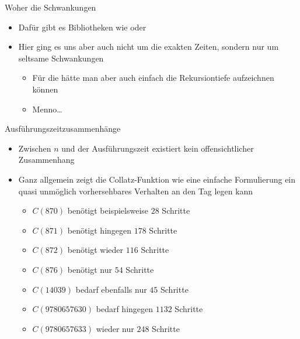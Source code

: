 {\begin{frame}{Woher die Schwankungen}
\begin{itemize}[<+(1)->]
\begin{itemize}
        \item Das Zeitmessen selbst braucht Zeit
        \item Die Java Virtual Machine hat zu Beginn einiges zusätzlich zu tun
        \item Dienste wie die Garbage-Collection können unkontrolliert dazwischenfunken
    \end{itemize}
    \item Dafür gibt es Bibliotheken wie  oder 
    \item Hier ging es uns aber auch nicht um die exakten Zeiten, sondern nur um seltsame Schwankungen \begin{itemize}
        \item Für die hätte man aber auch einfach die Rekursiontiefe aufzeichnen können
        \item Menno\ldots
    \end{itemize}
\end{itemize}
\end{frame}
}
\fi

\begin{frame}{Ausführungszeitzusammenhänge}
    \begin{itemize}[<+(1)->]
        \itemsep8pt
        \item Zwischen \(n\) und der Ausführungszeit existiert kein offensichtlicher Zusammenhang
        \item Ganz allgemein zeigt die Collatz-Funktion wie eine einfache Formulierung ein quasi unmöglich vorhersehbares Verhalten an den Tag legen kann\; \begin{itemize}
            \itemsep2pt
            \item $C(870)$ benötigt beispielsweise $28$ Schritte
            \item $C(871)$ benötigt hingegen $178$ Schritte
            \item $C(872)$ benötigt wieder $116$ Schritte
            \item $C(876)$ benötigt nur $54$ Schritte
            \iffull\item $C(14039)$ bedarf ebenfalls nur $45$ Schritte
            \item $C(9780657630)$ bedarf hingegen $1132$ Schritte
            \item $C(9780657633)$ wieder nur $248$ Schritte
            \fi
        \end{itemize}
    \end{itemize}
\end{frame}

